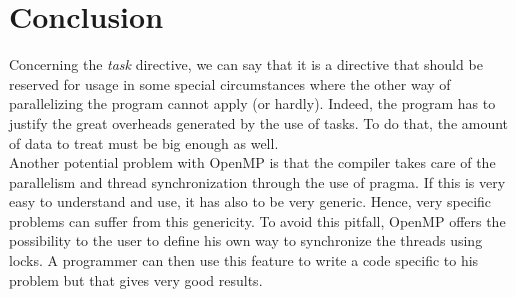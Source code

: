 \chapter{Conclusion}

Concerning the \textit{task} directive, we can say that it is a directive that should be reserved for usage in some special circumstances where the other way of parallelizing the program cannot apply (or hardly). Indeed, the program has to justify the great overheads generated by the use of tasks. To do that, the amount of data to treat must be big enough as well.\\

Another potential problem with OpenMP is that the compiler takes care of the parallelism and thread synchronization through the use of pragma. If this is very easy to understand and use, it has also to be very generic. Hence, very specific problems can suffer from this genericity. To avoid this pitfall, OpenMP offers the possibility to the user to define his own way to synchronize the threads using locks. A programmer can then use this feature to write a code specific to his problem but that gives very good results. 
